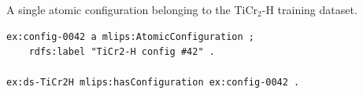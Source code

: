 A single atomic configuration belonging to the TiCr$_2$-H training dataset.
\begin{lstlisting}[language=turtle]
ex:config-0042 a mlips:AtomicConfiguration ;
    rdfs:label "TiCr2-H config #42" .

ex:ds-TiCr2H mlips:hasConfiguration ex:config-0042 .
\end{lstlisting}
